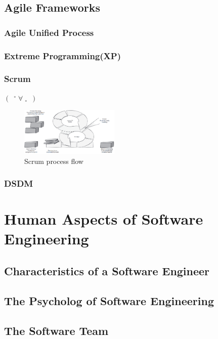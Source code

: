 \subsection{Agile Frameworks}

\subsubsection{Agile Unified Process}

\subsubsection{Extreme Programming(XP)}

\subsubsection{Scrum}
$\left(\enspace{}^{\circ}\;\forall\;{}_{\circ}\enspace\right)$

\begin{figure}[!htb]
    \centering
    \includegraphics[width=0.42\textwidth]{pic/SE3/Scrum process flow}
    \caption{Scrum process flow}
\end{figure}

\subsubsection{DSDM}

\newpage
\section{Human Aspects of Software Engineering}
\subsection{Characteristics of a Software Engineer}

\subsection{The Psycholog of Software Engineering}

\subsection{The Software Team}

